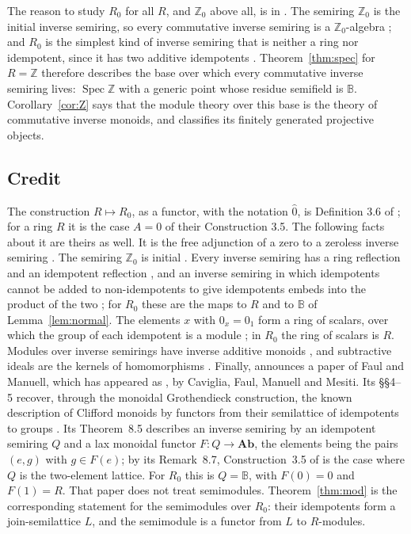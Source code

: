 \documentclass[11pt]{amsart}
\theoremstyle{remark}
\newcommand{\B}{\mathbb B}
\newcommand{\oz}{\widehat{0}}
\DeclareMathOperator{\Spec}{Spec}
\begin{document}
The reason to study $R_0$ for all $R$, and $\mathbb Z_0$ above all, is in \cite{FGJM}. The semiring $\mathbb Z_0$ is the initial inverse semiring, so every commutative inverse semiring is a $\mathbb Z_0$-algebra \cite[Proposition 5.1]{FGJM}; and $R_0$ is the simplest kind of inverse semiring that is neither a ring nor idempotent, since it has two additive idempotents \cite[Corollary 4.12]{FGJM}. Theorem~\ref{thm:spec} for $R=\mathbb Z$ therefore describes the base over which every commutative inverse semiring lives: $\Spec\mathbb Z$ with a generic point whose residue semifield is $\B$. Corollary~\ref{cor:Z} says that the module theory over this base is the theory of commutative inverse monoids, and classifies its finitely generated projective objects.

\subsection{Credit}
The construction $R\mapsto R_0$, as a functor, with the notation $\oz$, is Definition 3.6 of \cite{FGJM}; for a ring $R$ it is the case $A=0$ of their Construction 3.5. The following facts about it are theirs as well. It is the free adjunction of a zero to a zeroless inverse semiring \cite[\S3.1]{FGJM}. The semiring $\mathbb Z_0$ is initial \cite[Proposition 5.1]{FGJM}. Every inverse semiring has a ring reflection and an idempotent reflection \cite[Proposition 4.13]{FGJM}, and an inverse semiring in which idempotents cannot be added to non-idempotents to give idempotents embeds into the product of the two \cite[Theorem 7.2]{FGJM}; for $R_0$ these are the maps to $R$ and to $\B$ of Lemma~\ref{lem:normal}. The elements $x$ with $0_x=0_1$ form a ring of scalars, over which the group of each idempotent is a module \cite[Propositions 4.7 and 4.8]{FGJM}; in $R_0$ the ring of scalars is $R$. Modules over inverse semirings have inverse additive monoids \cite[Proposition 6.1]{FGJM}, and subtractive ideals are the kernels of homomorphisms \cite[Definition 6.3, Theorem 6.5]{FGJM}. Finally, \cite[\S7]{FGJM} announces a paper of Faul and Manuell, which has appeared as \cite{CFMM}, by Caviglia, Faul, Manuell and Mesiti. Its \S\S4--5 recover, through the monoidal Grothendieck construction, the known description of Clifford monoids by functors from their semilattice of idempotents to groups \cite{Pasku}. Its Theorem~8.5 describes an inverse semiring by an idempotent semiring $Q$ and a lax monoidal functor $F\colon Q\to\mathbf{Ab}$, the elements being the pairs $(e,g)$ with $g\in F(e)$; by its Remark~8.7, Construction~3.5 of \cite{FGJM} is the case where $Q$ is the two-element lattice. For $R_0$ this is $Q=\B$, with $F(0)=0$ and $F(1)=R$. That paper does not treat semimodules. Theorem~\ref{thm:mod} is the corresponding statement for the semimodules over $R_0$: their idempotents form a join-semilattice $L$, and the semimodule is a functor from $L$ to $R$-modules.
\end{document}

